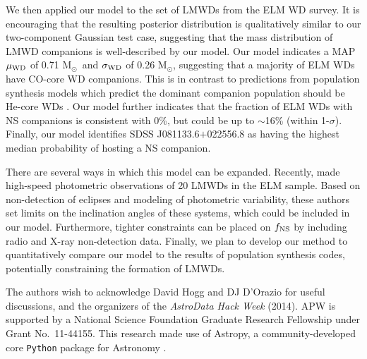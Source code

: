 \documentclass[apjl]{emulateapj}
\newcommand{\Msun}{\ifmmode {{\rm M}_{\odot}}\else M$_{\odot}$\fi}
\begin{document}
We then applied our model to the set of LMWDs from the ELM WD survey. It is encouraging that the resulting posterior distribution is qualitatively similar to our two-component Gaussian test case, suggesting that the mass distribution of LMWD companions is well-described by our model. Our model indicates a MAP $\mu_{\rm WD}$ of 0.71 \Msun\ and $\sigma_{\rm WD}$ of 0.26 \Msun, suggesting that a majority of ELM WDs have CO-core WD companions. This is in contrast to predictions from population synthesis models which predict the dominant companion population should be He-core WDs \citep[e.g.,][]{toonen12}. Our model further indicates that the fraction of ELM WDs with NS companions is consistent with 0\%, but could be up to $\sim$16\% (within 1-$\sigma$). Finally, our model identifies SDSS J081133.6$+$022556.8 as having the highest median probability of hosting a NS companion.


There are several ways in which this model can be expanded. Recently, \citet{hermes14} made high-speed photometric observations of 20 LMWDs in the ELM sample. Based on non-detection of eclipses and modeling of photometric variability, these authors set limits on the inclination angles of these systems, which could be included in our model. Furthermore, tighter constraints can be placed on $f_{\rm NS}$ by including radio and X-ray non-detection data. Finally, we plan to develop our method to quantitatively compare our model to the results of population synthesis codes, potentially constraining the formation of LMWDs.




\acknowledgements
The authors wish to acknowledge David Hogg and DJ D'Orazio for useful discussions, and the organizers of the \emph{AstroData Hack Week} (2014). 
APW is supported by a National Science Foundation Graduate Research Fellowship under Grant No.\ 11-44155. 
This research made use of Astropy, a community-developed core \texttt{Python} package for Astronomy \citep{astropy13}. \\
\end{document}
